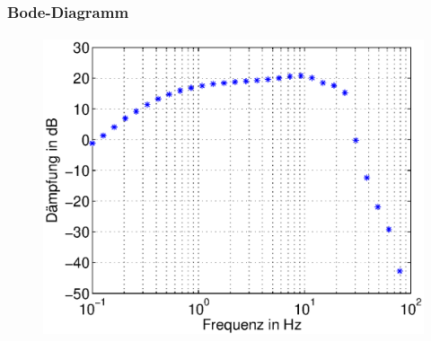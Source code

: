 \begin{frame}
\frametitle{Bode-Diagramm}
\framesubtitle{}
    \begin{figure}[H]
    \begin{center}
            \includegraphics[scale=0.2]{./img/plots/Auf_5_bode_db.eps}
    \end{center}
    \end{figure}
\end{frame}


